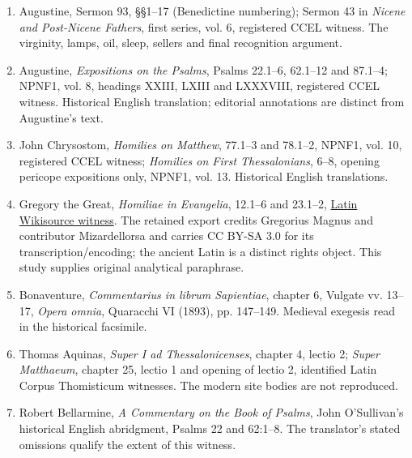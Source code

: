 \begin{enumerate}
\item Augustine, Sermon 93, §§1--17 (Benedictine numbering); Sermon 43 in \textit{Nicene and Post-Nicene Fathers}, first series, vol. 6, registered CCEL witness. The virginity, lamps, oil, sleep, sellers and final recognition argument.
\item Augustine, \textit{Expositions on the Psalms}, Psalms 22.1--6, 62.1--12 and 87.1--4; NPNF1, vol. 8, headings XXIII, LXIII and LXXXVIII, registered CCEL witness. Historical English translation; editorial annotations are distinct from Augustine's text.
\item John Chrysostom, \textit{Homilies on Matthew}, 77.1--3 and 78.1--2, NPNF1, vol. 10, registered CCEL witness; \textit{Homilies on First Thessalonians}, 6--8, opening pericope expositions only, NPNF1, vol. 13. Historical English translations.
\item Gregory the Great, \textit{Homiliae in Evangelia}, 12.1--6 and 23.1--2, \href{https://la.wikisource.org/wiki/Homiliarum_in_Evangelia}{Latin Wikisource witness}. The retained export credits Gregorius Magnus and contributor Mizardellorsa and carries CC BY-SA 3.0 for its transcription/encoding; the ancient Latin is a distinct rights object. This study supplies original analytical paraphrase.
\item Bonaventure, \textit{Commentarius in librum Sapientiae}, chapter 6, Vulgate vv. 13--17, \textit{Opera omnia}, Quaracchi VI (1893), pp. 147--149. Medieval exegesis read in the historical facsimile.
\item Thomas Aquinas, \textit{Super I ad Thessalonicenses}, chapter 4, lectio 2; \textit{Super Matthaeum}, chapter 25, lectio 1 and opening of lectio 2, identified Latin Corpus Thomisticum witnesses. The modern site bodies are not reproduced.
\item Robert Bellarmine, \textit{A Commentary on the Book of Psalms}, John O'Sullivan's historical English abridgment, Psalms 22 and 62:1--8. The translator's stated omissions qualify the extent of this witness.
\end{enumerate}

